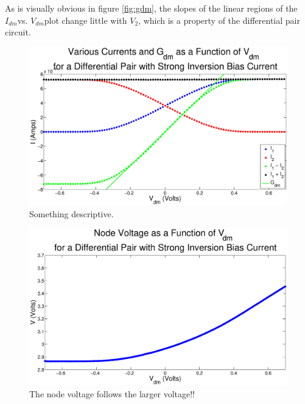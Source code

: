 \documentclass{article}
\newcommand{\Vtwo}{{$V_{2}$}}
\newcommand{\Vdm}{{$V_{dm}$}}
\newcommand{\Idm}{{$I_{dm}$}}
\begin{document}
As is visually obvious in figure \ref{fig:gdm}, the slopes of the linear regions of the \Idm vs. \Vdm plot change little with \Vtwo, which is a property of the differential pair circuit.



\begin{figure}[H]
\centering
\includegraphics[width=\linewidth]{./Figures/AllCurrentsStrongInversion.eps}
\caption{Something descriptive. }
\label{fig:AllCurrentsStrongInversion }
\end{figure}


\begin{figure}[H]
\centering
\includegraphics[width=\linewidth]{./Figures/NodeVoltageStrongInversion.eps}
\caption{The node voltage follows the larger voltage!!}
\label{fig:nodevoltageSI}
\end{figure}
\end{document}
